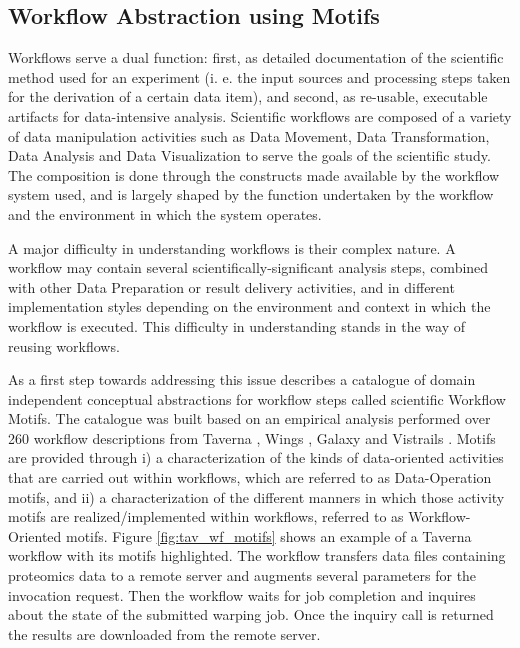 \subsection{Workflow Abstraction using Motifs}
\label{sec:abstraction}
Workflows serve a dual function: first, as detailed documentation of the scientific method used for an experiment (i. e. the input sources and processing steps taken for the derivation of a certain data item), and second, as re-usable, executable artifacts for data-intensive analysis. 
Scientific workflows are composed of a variety of data manipulation activities such as Data Movement, Data Transformation, Data Analysis and Data Visualization to serve the goals of the scientific study. The composition is done through the constructs made available by the workflow system used, and is largely shaped by the function undertaken by the workflow and the environment in which the system operates.

A major difficulty in understanding workflows is their complex nature. A workflow may contain several scientifically-significant analysis steps, combined with other Data Preparation or result delivery activities, and in different implementation styles depending on the environment and context in which the workflow is executed. This difficulty in understanding stands in the way of reusing workflows.

As a first step towards addressing this issue \cite{garijo_Alper_2012} describes a catalogue of domain independent conceptual abstractions for workflow steps called scientific Workflow Motifs. The catalogue was built based on an empirical analysis performed over 260 workflow descriptions from Taverna \cite{taverna}, Wings \cite{DBLP:journals/expert/GilRKGGMD11}, Galaxy \cite{Goecks_Nekrutenko_Taylor_2010} and Vistrails \cite{Callahan06-vistrails}. Motifs are provided through i) a characterization of the kinds of data-oriented activities that are carried out within workflows, which are referred to as Data-Operation motifs, and ii) a characterization of the different manners in which those activity motifs are realized/implemented within workflows, referred to as Workflow-Oriented motifs. Figure \ref{fig:tav_wf_motifs} shows an example of a Taverna workflow with its motifs highlighted. The workflow transfers data files containing proteomics data to a remote server and  augments several parameters for the invocation request. Then the workflow waits for job completion and inquires about the state of the submitted warping job. Once the inquiry call is returned the results are downloaded from the remote server.

